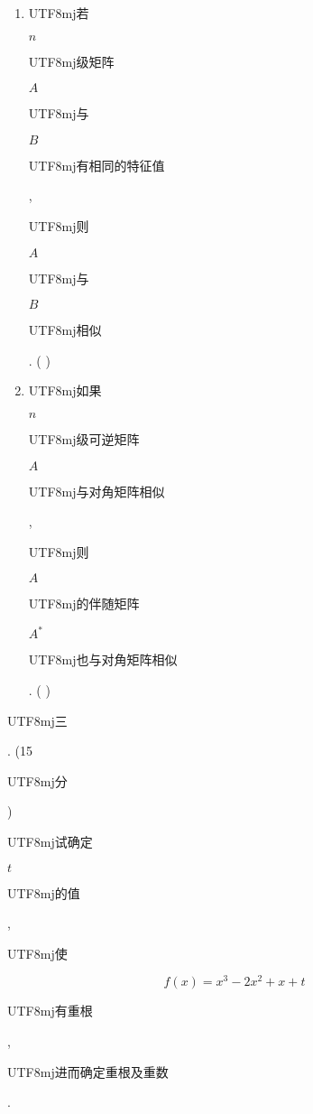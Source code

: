 \documentclass[10pt]{article}
\begin{document}
\begin{enumerate}
  \item \begin{CJK}{UTF8}{mj}若\end{CJK} $n$ \begin{CJK}{UTF8}{mj}级矩阵\end{CJK} $A$ \begin{CJK}{UTF8}{mj}与\end{CJK} $B$ \begin{CJK}{UTF8}{mj}有相同的特征值\end{CJK}, \begin{CJK}{UTF8}{mj}则\end{CJK} $A$ \begin{CJK}{UTF8}{mj}与\end{CJK} $B$ \begin{CJK}{UTF8}{mj}相似\end{CJK}. ( )

  \item \begin{CJK}{UTF8}{mj}如果\end{CJK} $n$ \begin{CJK}{UTF8}{mj}级可逆矩阵\end{CJK} $A$ \begin{CJK}{UTF8}{mj}与对角矩阵相似\end{CJK}, \begin{CJK}{UTF8}{mj}则\end{CJK} $A$ \begin{CJK}{UTF8}{mj}的伴随矩阵\end{CJK} $A^{*}$ \begin{CJK}{UTF8}{mj}也与对角矩阵相似\end{CJK}. ( )

\end{enumerate}
\begin{CJK}{UTF8}{mj}三\end{CJK}. (15 \begin{CJK}{UTF8}{mj}分\end{CJK}) \begin{CJK}{UTF8}{mj}试确定\end{CJK} $t$ \begin{CJK}{UTF8}{mj}的值\end{CJK}, \begin{CJK}{UTF8}{mj}使\end{CJK}
$$
f(x)=x^{3}-2 x^{2}+x+t
$$
\begin{CJK}{UTF8}{mj}有重根\end{CJK}, \begin{CJK}{UTF8}{mj}进而确定重根及重数\end{CJK}.
\end{document}

